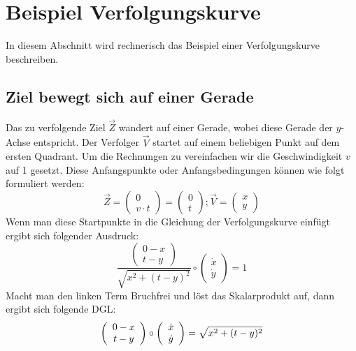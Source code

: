 %
%
%
\section{Beispiel Verfolgungskurve
\label{lambertw:section:teil4}}
In diesem Abschnitt wird rechnerisch das Beispiel einer Verfolgungskurve beschreiben.

\subsection{Ziel bewegt sich auf einer Gerade
\label{lambertw:subsection:malorum}}
Das zu verfolgende Ziel \(\overrightarrow{Z}\) wandert auf einer Gerade, wobei diese Gerade der \(y\)-Achse entspricht. Der Verfolger \(\overrightarrow{V}\) startet auf einem beliebigen Punkt auf dem ersten Quadrant. Um die Rechnungen zu vereinfachen wir die Geschwindigkeit \(v\) auf 1 gesetzt. Diese Anfangspunkte oder Anfangsbedingungen können wie folgt formuliert werden:
\begin{equation}
	\overrightarrow{Z}
	=
	\left( \begin{array}{c} 0 \\ v \cdot t \end{array} \right)
	=
	\left( \begin{array}{c} 0 \\ t \end{array} \right)
	;
	\overrightarrow{V}
	=
	\left( \begin{array}{c} x \\ y \end{array} \right)
	\label{lambertw:Anfangspunkte}
\end{equation}
Wenn man diese Startpunkte in die Gleichung der Verfolgungskurve einfügt ergibt sich folgender Ausdruck:
\begin{equation}
	\frac{\left( \begin{array}{c} 0-x \\ t-y \end{array} \right)}{\sqrt{x^2 + (t-y)^2}}
	\circ
	\left(\begin{array}{c} \dot{x} \\ \dot{y} \end{array}\right)
	=
	1
	\label{lambertw:eqMitAnfangspunkte}
\end{equation}
Macht man den linken Term Bruchfrei und löst das Skalarprodukt auf, dann ergibt sich folgende DGL:
\[
	\left( \begin{array}{c} 0-x \\ t-y \end{array} \right)
	\circ
	\left(\begin{array}{c} \dot{x} \\ \dot{y} \end{array}\right)
	= \sqrt{x^2 + (t-y)^2}\\
\]
